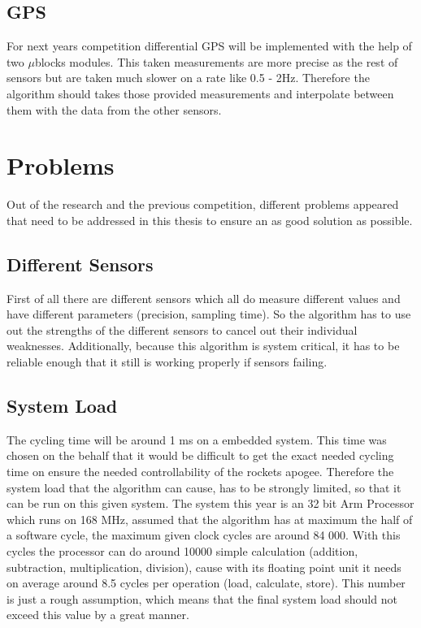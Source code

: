  \subsection{GPS}
 For next years competition differential GPS will be implemented with the help of two $\mu$blocks modules.
 This taken measurements are more precise as the rest of sensors but are taken much slower on a rate like 0.5 - 2Hz. 
 Therefore the algorithm should takes those provided measurements and interpolate between them with the data from the other sensors.
 
 
 \section{Problems}
 Out of the research and the previous competition, different problems appeared that need to be addressed in this thesis to ensure an as good solution as possible.
 
 \subsection{Different Sensors}
 First of all there are different sensors which all do measure different values and have different parameters (precision, sampling time).
 So the algorithm has to use out the strengths of the different sensors to cancel out their individual weaknesses.
 Additionally, because this algorithm is system critical, it has to be reliable enough that it still is working properly if sensors failing. 
 
 \subsection{System Load}
 The cycling time will be around 1 ms on a embedded system. This time was chosen on the behalf that it would be difficult to get the exact needed cycling time on ensure the needed controllability of the rockets apogee.
 Therefore the system load that the algorithm can cause, has to be strongly limited, so that it can be run on this given system. 
 The system this year is an 32 bit Arm Processor which runs on 168 MHz, assumed that the algorithm has at maximum the half of a software cycle, the maximum given clock cycles are around 84 000.
 With this cycles the processor can do around 10000 simple calculation (addition, subtraction, multiplication, division),
 cause with its floating point unit it needs on average around 8.5 cycles per operation (load, calculate, store). 
 This number is just a rough assumption, which means that the final system load should not exceed this value by a great manner.
 
